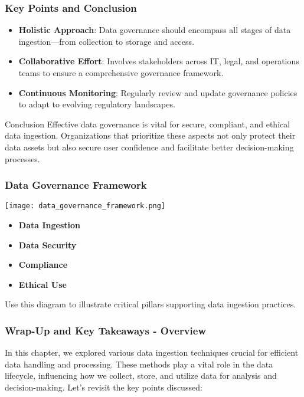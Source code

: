 \documentclass{beamer}
\begin{document}
\begin{frame}[fragile]
    \frametitle{Key Points and Conclusion}
    \begin{itemize}
        \item \textbf{Holistic Approach}: Data governance should encompass all stages of data ingestion—from collection to storage and access.
        \item \textbf{Collaborative Effort}: Involves stakeholders across IT, legal, and operations teams to ensure a comprehensive governance framework.
        \item \textbf{Continuous Monitoring}: Regularly review and update governance policies to adapt to evolving regulatory landscapes.
    \end{itemize}
    
    \begin{block}{Conclusion}
        Effective data governance is vital for secure, compliant, and ethical data ingestion. Organizations that prioritize these aspects not only protect their data assets but also secure user confidence and facilitate better decision-making processes.
    \end{block}
\end{frame}

\begin{frame}[fragile]
    \frametitle{Data Governance Framework}
    \centering
    \texttt{[image: data\_governance\_framework.png]} %
    \begin{itemize}
        \item \textbf{Data Ingestion}
        \item \textbf{Data Security}
        \item \textbf{Compliance}
        \item \textbf{Ethical Use}
    \end{itemize}
    Use this diagram to illustrate critical pillars supporting data ingestion practices.
\end{frame}

\begin{frame}[fragile]
    \frametitle{Wrap-Up and Key Takeaways - Overview}
    In this chapter, we explored various data ingestion techniques crucial for efficient data handling and processing. 
    These methods play a vital role in the data lifecycle, influencing how we collect, store, and utilize data for analysis and decision-making. 
    Let’s revisit the key points discussed:
\end{frame}
\end{document}
